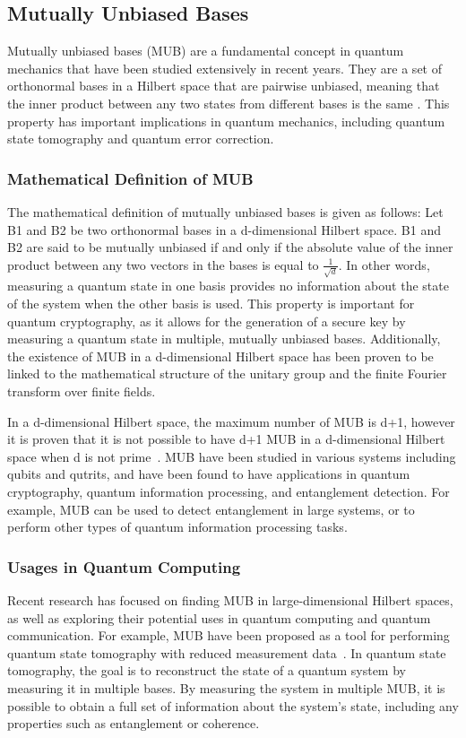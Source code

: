 \subsection{Mutually Unbiased Bases}\label{subsec:mutually-unbiased-bases}
Mutually unbiased bases (MUB) are a fundamental concept in quantum mechanics that have been studied extensively in recent years.
They are a set of orthonormal bases in a Hilbert space that are pairwise unbiased, meaning that the inner product between
any two states from different bases is the same \cite{durt2010mutually}.
This property has important implications in quantum mechanics,
including quantum state tomography and quantum error correction.

\subsubsection{Mathematical Definition of MUB}\label{subsubsec:mathematical-definition-of-mub}
The mathematical definition of mutually unbiased bases is given as follows:
Let B1 and B2 be two orthonormal bases in a d-dimensional Hilbert space.
B1 and B2 are said to be mutually unbiased
if and only if the absolute value of the inner product between any two vectors in the bases is equal to $\frac{1}{\sqrt {d}}$.
In other words, measuring a quantum state in one basis provides no information about the state of the
system when the other basis is used.
This property is important for quantum cryptography,
as it allows for the generation of a secure key by measuring a quantum state in multiple, mutually unbiased bases.
Additionally, the existence of MUB in a d-dimensional Hilbert space has been proven to be linked to the
mathematical structure of the unitary group and the finite Fourier transform over finite fields.

In a d-dimensional Hilbert space, the maximum number of MUB is d+1, however it is proven that it is not possible to
have d+1 MUB in a d-dimensional Hilbert space when d is not prime~\cite{ivanovic1987differentiate}.
MUB have been studied in various systems including qubits and qutrits, and have been found to have applications in
quantum cryptography, quantum information processing, and entanglement detection.
For example, MUB can be used to detect entanglement in large systems, or to perform other types of quantum
information processing tasks.

\subsubsection{Usages in Quantum Computing}
Recent research has focused on finding MUB in large-dimensional Hilbert spaces, as well as exploring their potential
uses in quantum computing and quantum communication.
For example, MUB have been proposed as a tool for performing quantum state tomography with reduced
measurement data~\cite{bandyopadhyay2002new}.
In quantum state tomography, the goal is to reconstruct the state of a quantum system by measuring it in multiple bases.
By measuring the system in multiple MUB, it is possible to obtain a full set of information about the system's state,
including any properties such as entanglement or coherence.

